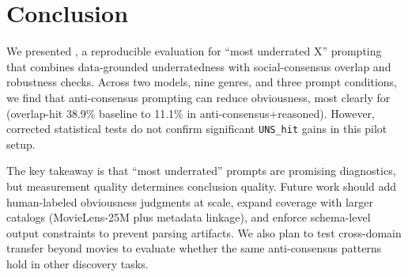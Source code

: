 \section{Conclusion}
\label{sec:conclusion}
We presented \benchmarkname, a reproducible evaluation for ``most underrated X'' prompting that combines data-grounded underratedness with social-consensus overlap and robustness checks. Across two models, nine genres, and three prompt conditions, we find that anti-consensus prompting can reduce obviousness, most clearly for \gptfourone (overlap-hit 38.9\% baseline to 11.1\% in anti-consensus+reasoned). However, corrected statistical tests do not confirm significant \texttt{UNS\_hit} gains in this pilot setup.

The key takeaway is that ``most underrated'' prompts are promising diagnostics, but measurement quality determines conclusion quality. Future work should add human-labeled obviousness judgments at scale, expand coverage with larger catalogs (\eg MovieLens-25M plus metadata linkage), and enforce schema-level output constraints to prevent parsing artifacts. We also plan to test cross-domain transfer beyond movies to evaluate whether the same anti-consensus patterns hold in other discovery tasks.
